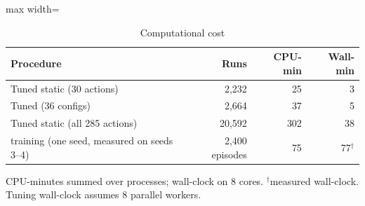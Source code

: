 \begin{table}[t]
\centering
\caption{Computational cost}\label{tab:cost}
\setlength{\tabcolsep}{3pt}
\begin{adjustbox}{max width=\linewidth}
\begin{tabular}{lrrr}
\toprule
Procedure & Runs & CPU-min & Wall-min\\ \midrule
Tuned static (30 actions) & 2,232 & 25 & 3\\
Tuned \Rw{} (36 configs) & 2,664 & 37 & 5\\
Tuned static (all 285 actions) & 20,592 & 302 & 38\\
\sgalns{} training (one seed, measured on seeds 3--4) & 2{,}400 episodes & 75 & 77$^{\dagger}$\\
\bottomrule
\end{tabular}
\end{adjustbox}
\par\vspace{2pt}\parbox{\linewidth}{\footnotesize CPU-minutes summed over processes; wall-clock on 8 cores. $^{\dagger}$measured wall-clock. Tuning wall-clock assumes 8 parallel workers.}
\end{table}
